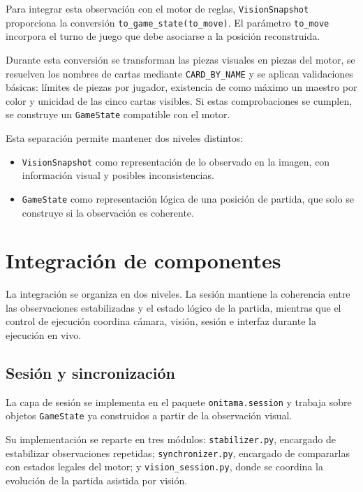 Para integrar esta observación con el motor de reglas, \texttt{VisionSnapshot} proporciona la conversión \texttt{to\_game\_state(to\_move)}. El parámetro \texttt{to\_move} incorpora el turno de juego que debe asociarse a la posición reconstruida.

Durante esta conversión se transforman las piezas visuales en piezas del motor, se resuelven los nombres de cartas mediante \texttt{CARD\_BY\_NAME} y se aplican validaciones básicas: límites de piezas por jugador, existencia de como máximo un maestro por color y unicidad de las cinco cartas visibles. Si estas comprobaciones se cumplen, se construye un \texttt{GameState} compatible con el motor.

Esta separación permite mantener dos niveles distintos: 
\begin{itemize}
    \item \texttt{VisionSnapshot} como representación de lo observado en la imagen, con información visual y posibles inconsistencias.
    \item \texttt{GameState} como representación lógica de una posición de partida, que solo se construye si la observación es coherente.
\end{itemize}


\section{Integración de componentes}
\label{sec:integracion-componentes}

La integración se organiza en dos niveles. La sesión mantiene la coherencia entre las observaciones estabilizadas y el estado lógico de la partida, mientras que el control de ejecución coordina cámara, visión, sesión e interfaz durante la ejecución en vivo.

\subsection{Sesión y sincronización}
\label{subsec:sesion-sincronizacion}

La capa de sesión se implementa en el paquete \texttt{onitama.session} y trabaja sobre objetos \texttt{GameState} ya construidos a partir de la observación visual. 

Su implementación se reparte en tres módulos: \texttt{stabilizer.py}, encargado de estabilizar observaciones repetidas; \texttt{synchronizer.py}, encargado de compararlas con estados legales del motor; y \texttt{vision\_session.py}, donde se coordina la evolución de la partida asistida por visión.

